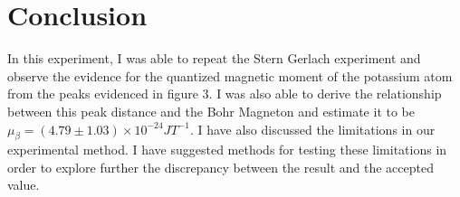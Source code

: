 \documentclass{article}%
\begin{document}
\section{Conclusion}
In this experiment, I was able to repeat the Stern Gerlach experiment and observe the evidence for the quantized magnetic moment of the potassium atom from the peaks evidenced in figure 3.
I was also able to derive the relationship between this peak distance and the Bohr Magneton and estimate it to be $\mu_\beta = (4.79 \pm 1.03) \times 10^{-24} JT^{-1}$. I have also discussed the limitations in our experimental method. I have suggested methods for testing these limitations in order to explore further the discrepancy between the result and the accepted value.
\printbibliography
\end{document}

